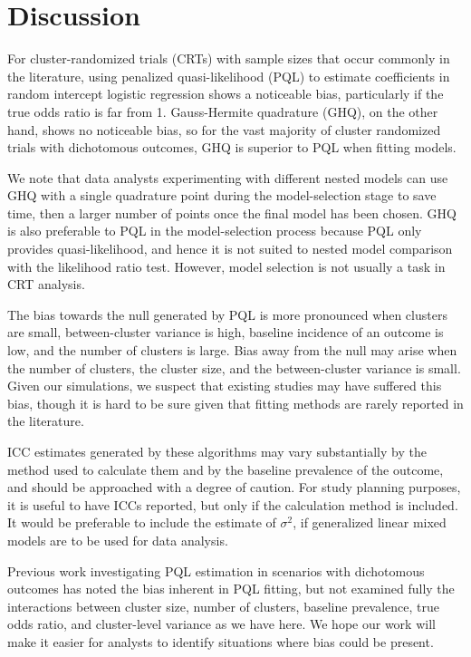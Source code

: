 \documentclass[Afour,times,sagev,doublespace]{sagej}
\begin{document}
\section{Discussion}

For cluster-randomized trials (CRTs) with sample sizes that occur commonly in the literature, using penalized quasi-likelihood (PQL) to estimate coefficients in random intercept logistic regression shows a noticeable bias, particularly if the true odds ratio is far from 1. Gauss-Hermite quadrature (GHQ), on the other hand, shows no noticeable bias, so for the vast majority of cluster randomized trials with dichotomous outcomes, GHQ is superior to PQL when fitting models. 

We note that data analysts experimenting with different nested models can use GHQ with a single quadrature point during the model-selection stage to save time, then a larger number of points once the final model has been chosen. GHQ is also preferable to PQL in the model-selection process because PQL only provides quasi-likelihood, and hence it is not suited to nested model comparison with the likelihood ratio test. However, model selection is not usually a task in CRT analysis.

The bias towards the null generated by PQL is more pronounced when clusters are small, between-cluster variance is high, baseline incidence of an outcome is low, and the number of clusters is large. Bias away from the null may arise when the number of clusters, the cluster size, and the between-cluster variance is small. Given our simulations, we suspect that existing studies may have suffered this bias, though it is hard to be sure given that fitting methods are rarely reported in the literature. 

ICC estimates generated by these algorithms may vary substantially by the method used to calculate them and by the baseline prevalence of the outcome, and should be approached with a degree of caution.  For study planning purposes, it is useful to have ICCs reported, but only if the calculation method is included.  It would be preferable to include the estimate of $\sigma^2$, if generalized linear mixed models are to be used for data analysis.


Previous work investigating PQL estimation in scenarios with dichotomous outcomes has noted the bias inherent in PQL fitting, \cite{jang_numerical_2009,zhang_fitting_2011} but not examined fully the interactions between cluster size, number of clusters, baseline prevalence, true odds ratio, and cluster-level variance as we have here. We hope our work will make it easier for analysts to identify situations where bias could be present.
\end{document}
